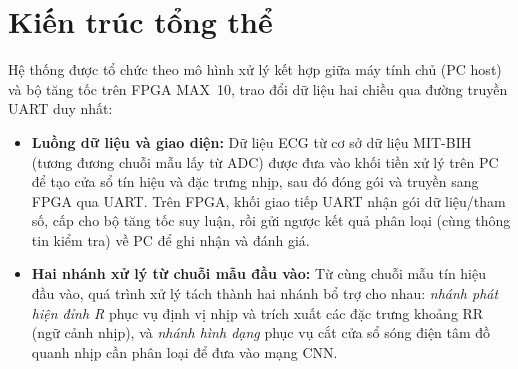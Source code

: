 \section{Kiến trúc tổng thể}\label{sec:kientruc}


Hệ thống được tổ chức theo mô hình xử lý kết hợp giữa máy tính chủ (PC host) và bộ tăng tốc trên FPGA MAX~10, trao đổi dữ liệu hai chiều qua đường truyền UART duy nhất:

\begin{itemize}
	\item \textbf{Luồng dữ liệu và giao diện:} Dữ liệu ECG từ cơ sở dữ liệu MIT-BIH (tương đương chuỗi mẫu lấy từ ADC) được đưa vào khối tiền xử lý trên PC để tạo cửa sổ tín hiệu và đặc trưng nhịp, sau đó đóng gói và truyền sang FPGA qua UART. Trên FPGA, khối giao tiếp UART nhận gói dữ liệu/tham số, cấp cho bộ tăng tốc suy luận, rồi gửi ngược kết quả phân loại (cùng thông tin kiểm tra) về PC để ghi nhận và đánh giá.
	\item \textbf{Hai nhánh xử lý từ chuỗi mẫu đầu vào:} Từ cùng chuỗi mẫu tín hiệu đầu vào, quá trình xử lý tách thành hai nhánh bổ trợ cho nhau: \emph{nhánh phát hiện đỉnh R} phục vụ định vị nhịp và trích xuất các đặc trưng khoảng RR (ngữ cảnh nhịp), và \emph{nhánh hình dạng} phục vụ cắt cửa sổ sóng điện tâm đồ quanh nhịp cần phân loại để đưa vào mạng CNN.
\end{itemize}
